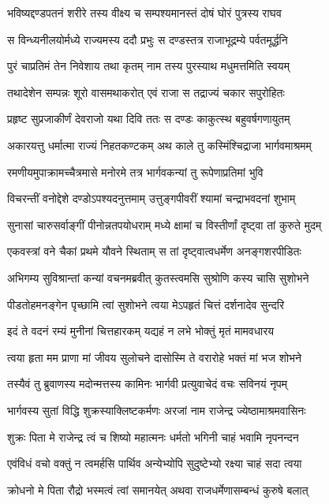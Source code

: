 \twolineshloka
{भविष्यद्दण्डपतनं शरीरे तस्य वीक्ष्य च}
{सम्पश्यमानस्तं दोषं घोरं पुत्रस्य राघव}%

\twolineshloka
{स विन्ध्यनीलयोर्मध्ये राज्यमस्य ददौ प्रभुः}
{स दण्डस्तत्र राजाभूद्रम्ये पर्वतमूर्द्धनि}%

\twolineshloka
{पुरं चाप्रतिमं तेन निवेशाय तथा कृतम्}
{नाम तस्य पुरस्याथ मधुमत्तमिति स्वयम्}%

\twolineshloka
{तथादेशेन सम्पन्नः शूरो वासमथाकरोत्}
{एवं राजा स तद्राज्यं चकार सपुरोहितः}%

\twolineshloka
{प्रहृष्ट सुप्रजाकीर्णं देवराजो यथा दिवि}
{ततः स दण्डः काकुत्स्थ बहुवर्षगणायुतम्}%

\twolineshloka
{अकारयत्तु धर्मात्मा राज्यं निहतकण्टकम्}
{अथ काले तु कस्मिंश्चिद्राजा भार्गवमाश्रमम्}%

\twolineshloka
{रमणीयमुपाक्रामच्चैत्रमासे मनोरमे}
{तत्र भार्गवकन्यां तु रूपेणाप्रतिमां भुवि}%

\twolineshloka
{विचरन्तीं वनोद्देशे दण्डोऽपश्यदनुत्तमाम्}
{उत्तुङ्गपीवरीं श्यामां चन्द्राभवदनां शुभाम्}%

\twolineshloka
{सुनासां चारुसर्वाङ्गीं पीनोन्नतपयोधराम्}
{मध्ये क्षामां च विस्तीर्णां दृष्ट्वा तां कुरुते मुदम्}%

\twolineshloka
{एकवस्त्रां वने चैकां प्रथमे यौवने स्थिताम्}
{स तां दृष्ट्वात्वधर्मेण अनङ्गशरपीडितः}%

\twolineshloka
{अभिगम्य सुविश्रान्तां कन्यां वचनमब्रवीत्}
{कुतस्त्वमसि सुश्रोणि कस्य चासि सुशोभने}%

\twolineshloka
{पीडतोहमनङ्गेन पृच्छामि त्वां सुशोभने}
{त्वया मेऽपहृतं चित्तं दर्शनादेव सुन्दरि}%

\twolineshloka
{इदं ते वदनं रम्यं मुनीनां चित्तहारकम्}
{यद्यहं न लभे भोक्तुं मृतं मामवधारय}%

\twolineshloka
{त्वया हृता मम प्राणा मां जीवय सुलोचने}
{दासोस्मि ते वरारोहे भक्तं मां भज शोभने}%

\twolineshloka
{तस्यैवं तु ब्रुवाणस्य मदोन्मत्तस्य कामिनः}
{भार्गवी प्रत्युवाचेदं वचः सविनयं नृपम्}%

\twolineshloka
{भार्गवस्य सुतां विद्धि शुक्रस्याक्लिष्टकर्मणः}
{अरजां नाम राजेन्द्र ज्येष्ठामाश्रमवासिनः}%

\twolineshloka
{शुक्रः पिता मे राजेन्द्र त्वं च शिष्यो महात्मनः}
{धर्मतो भगिनी चाहं भवामि नृपनन्दन}%

\twolineshloka
{एवंविधं वचो वक्तुं न त्वमर्हसि पार्थिव}
{अन्येभ्योपि सुदुष्टेभ्यो रक्ष्या चाहं सदा त्वया}%

\twolineshloka
{क्रोधनो मे पिता रौद्रो भस्मत्वं त्वां समानयेत्}
{अथवा राजधर्मेणासम्बन्धं कुरुषे बलात्}%

